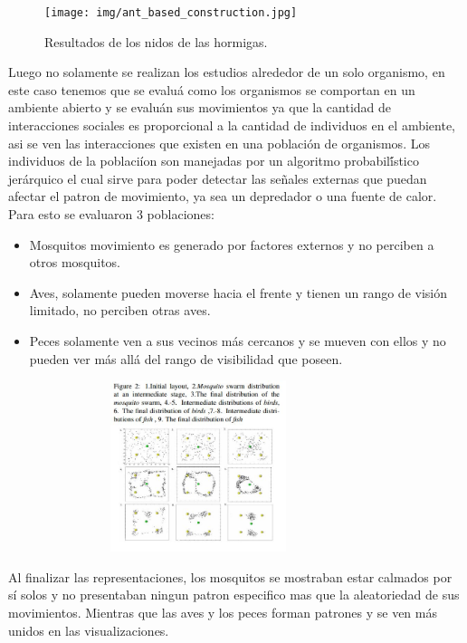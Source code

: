 \documentclass[conference]{IEEEtran}
\begin{document}
\begin{figure}[ht]
  \texttt{[image: img/ant\_based\_construction.jpg]}
  \caption{Resultados de los nidos de las hormigas. \cite{LP01}}
  \label{fig:ant_based_construction}
\end{figure}

Luego no solamente se realizan los estudios alrededor de un solo organismo, en este caso tenemos que se evalu\'a como los organismos se comportan en un ambiente abierto y se evalu\'an sus movimientos ya que la cantidad de interacciones sociales es proporcional a la cantidad de individuos en el ambiente, asi se ven las interacciones que existen en una poblaci\'on de organismos. \cite{ASTK01, PMLC01}
Los individuos de la poblaci\'ion son manejadas por un algoritmo probabil\'ístico jer\'arquico el cual sirve para poder detectar las se\~nales externas que puedan afectar el patron de movimiento, ya sea un depredador o una fuente de calor. 
Para esto se evaluaron 3 poblaciones:
\begin{itemize}
\item Mosquitos movimiento es generado por factores externos y no perciben a otros mosquitos.
\item Aves, solamente pueden moverse hacia el frente y tienen un rango de visi\'on limitado, no perciben otras aves.
\item Peces solamente ven a sus vecinos m\'as cercanos y se mueven con ellos y no pueden ver m\'as all\'a del rango de visibilidad que poseen.
\end{itemize}

\begin{figure}[ht]
  \includegraphics[width=9cm,height=5cm]{img/mosquitos.jpg}
  \caption{\cite{TMRT01}}
  \label{fig:mosquitos}
\end{figure}

Al finalizar las representaciones, los mosquitos se mostraban estar calmados por s\'i solos y no presentaban ningun patron especifico mas que la aleatoriedad de sus movimientos. Mientras que las aves y los peces forman patrones y se ven m\'as unidos en las visualizaciones. \cite{ASTK01}
\end{document}

